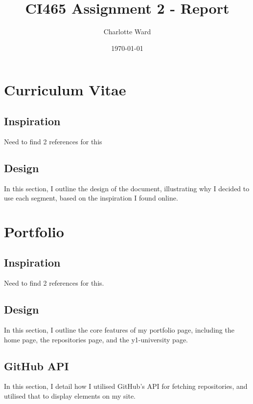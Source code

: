 \documentclass{scrartcl}
\begin{document}
\author{Charlotte Ward}
\date{\today}
\title{
CI465 Assignment 2 - Report
}
\maketitle

\tableofcontents

\section{Curriculum Vitae}

\subsection{Inspiration}

Need to find 2 references for this

\subsection{Design}

In this section, I outline the design of the document, illustrating why I decided to use each segment, based on the inspiration I found online.

\section{Portfolio}

\subsection{Inspiration}

Need to find 2 references for this.

\subsection{Design}

In this section, I outline the core features of my portfolio page, including the home page, the repositories page, and the y1-university page.

\subsection{GitHub API}

In this section, I detail how I utilised GitHub's API for fetching repositories, and utilised that to display elements on my site.

\printbibliography
\end{document}
